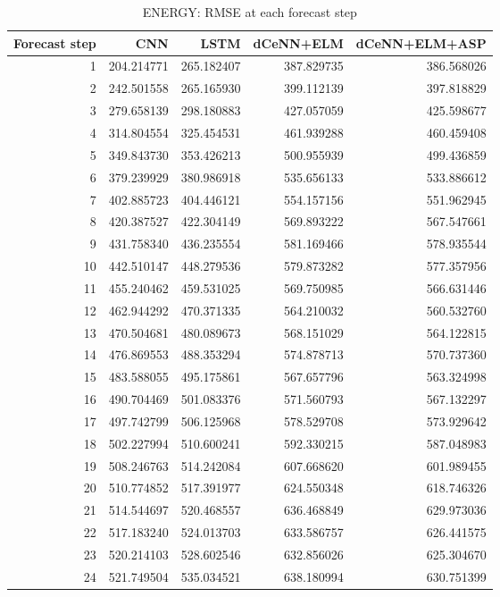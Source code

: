 \begin{table}
\caption{ENERGY: RMSE at each forecast step}
\begin{tabular}{rrrrr}
\toprule
Forecast step & CNN & LSTM & dCeNN+ELM & dCeNN+ELM+ASP \\
\midrule
1 & 204.214771 & 265.182407 & 387.829735 & 386.568026 \\
2 & 242.501558 & 265.165930 & 399.112139 & 397.818829 \\
3 & 279.658139 & 298.180883 & 427.057059 & 425.598677 \\
4 & 314.804554 & 325.454531 & 461.939288 & 460.459408 \\
5 & 349.843730 & 353.426213 & 500.955939 & 499.436859 \\
6 & 379.239929 & 380.986918 & 535.656133 & 533.886612 \\
7 & 402.885723 & 404.446121 & 554.157156 & 551.962945 \\
8 & 420.387527 & 422.304149 & 569.893222 & 567.547661 \\
9 & 431.758340 & 436.235554 & 581.169466 & 578.935544 \\
10 & 442.510147 & 448.279536 & 579.873282 & 577.357956 \\
11 & 455.240462 & 459.531025 & 569.750985 & 566.631446 \\
12 & 462.944292 & 470.371335 & 564.210032 & 560.532760 \\
13 & 470.504681 & 480.089673 & 568.151029 & 564.122815 \\
14 & 476.869553 & 488.353294 & 574.878713 & 570.737360 \\
15 & 483.588055 & 495.175861 & 567.657796 & 563.324998 \\
16 & 490.704469 & 501.083376 & 571.560793 & 567.132297 \\
17 & 497.742799 & 506.125968 & 578.529708 & 573.929642 \\
18 & 502.227994 & 510.600241 & 592.330215 & 587.048983 \\
19 & 508.246763 & 514.242084 & 607.668620 & 601.989455 \\
20 & 510.774852 & 517.391977 & 624.550348 & 618.746326 \\
21 & 514.544697 & 520.468557 & 636.468849 & 629.973036 \\
22 & 517.183240 & 524.013703 & 633.586757 & 626.441575 \\
23 & 520.214103 & 528.602546 & 632.856026 & 625.304670 \\
24 & 521.749504 & 535.034521 & 638.180994 & 630.751399 \\
\bottomrule
\end{tabular}
\end{table}
